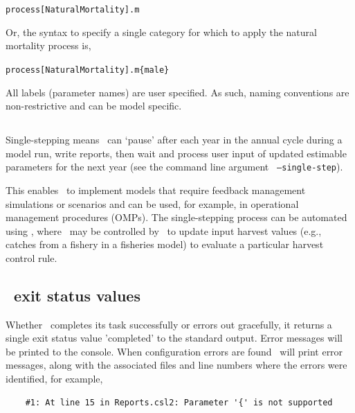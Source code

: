 \texttt{process[NaturalMortality].m}

Or, the syntax to specify a single category for which to apply the natural mortality process is,

\texttt{process[NaturalMortality].m\{male\}}

All labels (parameter names) are user specified. As such, naming conventions are non-restrictive and can be model specific.

\subsection{\label{sec:singlestepping}}

Single-stepping means \CNAME\ can `pause' after each year in the annual cycle during a model run, write reports, then wait and process user input of updated estimable parameters for the next year (see the command line argument \texttt{ --single-step}).

This enables \CNAME\ to implement models that require feedback management simulations or scenarios and can be used, for example, in operational management procedures (OMPs). The single-stepping process can be automated using \R, where \CNAME\ may be controlled by \R\ to update input harvest values (e.g., catches from a fishery in a fisheries model) to evaluate a particular harvest control rule.

\subsection{\CNAME\ exit status values}
Whether \CNAME\ completes its task successfully or errors out gracefully, it returns a single exit status value 'completed' to the standard output. Error messages will be printed to the console. When configuration errors are found \CNAME\ will print error messages, along with the associated files and line numbers where the errors were identified, for example,

{\small{\begin{verbatim}
	#1: At line 15 in Reports.csl2: Parameter '{' is not supported
\end{verbatim}}}
